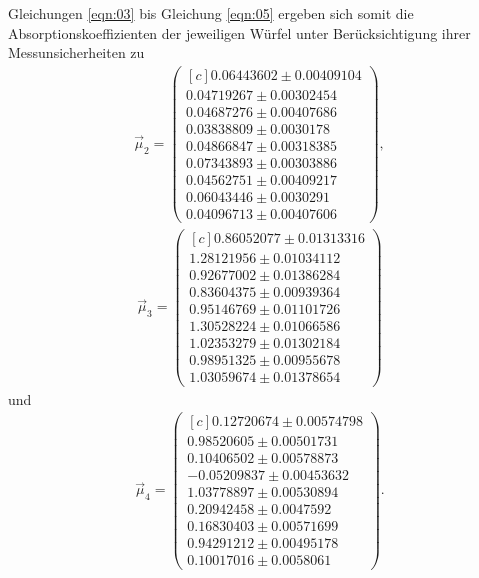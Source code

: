 Gleichungen \ref{eqn:03} bis Gleichung \ref{eqn:05} ergeben sich somit die
Absorptionskoeffizienten der jeweiligen Würfel unter Berücksichtigung ihrer
Messunsicherheiten zu
\begin{align}
  \vec{\mu}_2 = \begin{pmatrix*}[c]
                0.06443602 \pm 0.00409104 \\
                0.04719267 \pm 0.00302454 \\
                0.04687276 \pm 0.00407686 \\
                0.03838809 \pm 0.0030178 \\
                0.04866847 \pm 0.00318385 \\
                0.07343893 \pm 0.00303886 \\
                0.04562751 \pm 0.00409217 \\
                0.06043446 \pm 0.0030291 \\
                0.04096713 \pm 0.00407606
                \end{pmatrix*},
\end{align}
\begin{align}
  \vec{\mu}_3 = \begin{pmatrix*}[c]
                0.86052077 \pm 0.01313316  \\
                1.28121956 \pm 0.01034112  \\
                0.92677002 \pm 0.01386284  \\
                0.83604375 \pm 0.00939364  \\
                0.95146769 \pm 0.01101726  \\
                1.30528224 \pm 0.01066586 \\
                1.02353279 \pm 0.01302184  \\
                0.98951325 \pm 0.00955678  \\
                1.03059674 \pm 0.01378654
                \end{pmatrix*}
\end{align}
\noindent und
\begin{align}
  \vec{\mu}_4 = \begin{pmatrix*}[c]
                 0.12720674   \pm 0.00574798  \\
                 0.98520605   \pm 0.00501731  \\
                 0.10406502   \pm 0.00578873  \\
                 -0.05209837  \pm  0.00453632 \\
                 1.03778897   \pm 0.00530894  \\
                 0.20942458   \pm 0.0047592   \\
                 0.16830403   \pm 0.00571699  \\
                 0.94291212   \pm 0.00495178  \\
                 0.10017016   \pm 0.0058061
                \end{pmatrix*}.
\end{align}
